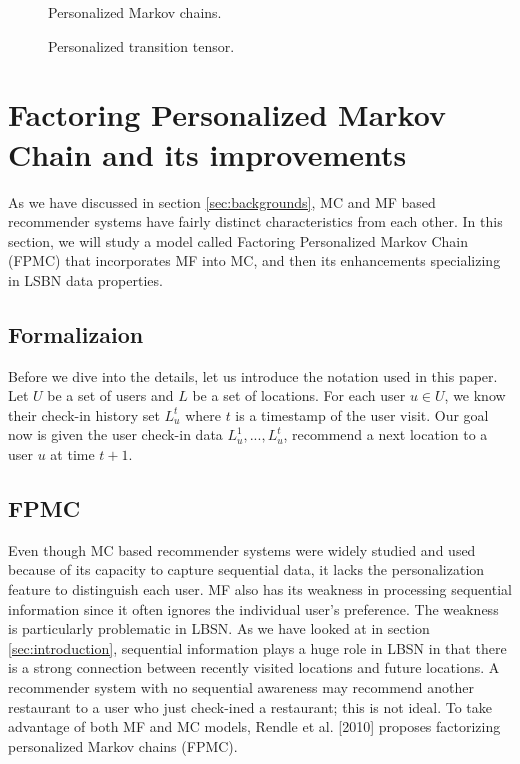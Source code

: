 \documentclass{sig-alternate}
\begin{document}
\begin{figure*}
\centering
{}
\caption{Personalized Markov chains.}
\label{fig:FPMC_naive}
\end{figure*}

\begin{figure}
\centering
{}
\caption{Personalized transition tensor.}
\label{fig:FPMC}
\end{figure}

\section{Factoring Personalized Markov Chain and its improvements}
\label{sec:fpmc}

As we have discussed in section \ref{sec:backgrounds}, MC and MF based recommender systems
have fairly distinct characteristics from each other. In this section, we will study a model called 
Factoring Personalized Markov Chain (FPMC) that incorporates MF into MC, and then its 
enhancements specializing in LSBN data properties.

\subsection{Formalizaion}
\label{sec:typeChangesSpecialChars}

Before we dive into the details, let us introduce the notation used in this paper. 
Let $U$ be a set of users and $L$ be a set of locations. For each user $u \in U$, 
we know their check-in history set \begin{math}L^t_u\end{math} where $t$ is a timestamp 
of the user visit. Our goal now is given the user check-in data 
\begin{math}L^1_u,...,L^t_u\end{math}, recommend a next location to 
a user $u$ at time $t + 1$.

\subsection{FPMC}
\label{sec:typeChangesSpecialChars}

Even though MC based recommender systems were widely studied and used because of 
its capacity to capture sequential data, it lacks the personalization feature to distinguish each user. 
MF also has its weakness in processing sequential information since it often ignores
 the individual user's preference. The weakness is particularly problematic in LBSN. 
As we have looked at in section \ref{sec:introduction}, sequential information plays a huge role in LBSN 
in that there is a strong connection between recently visited locations and future locations. 
A recommender system with no sequential awareness 
may recommend another restaurant to a user who just check-ined a restaurant; this is not ideal. 
To take advantage of both MF and MC models, Rendle et al. [2010] proposes factorizing personalized 
Markov chains (FPMC).
\end{document}
